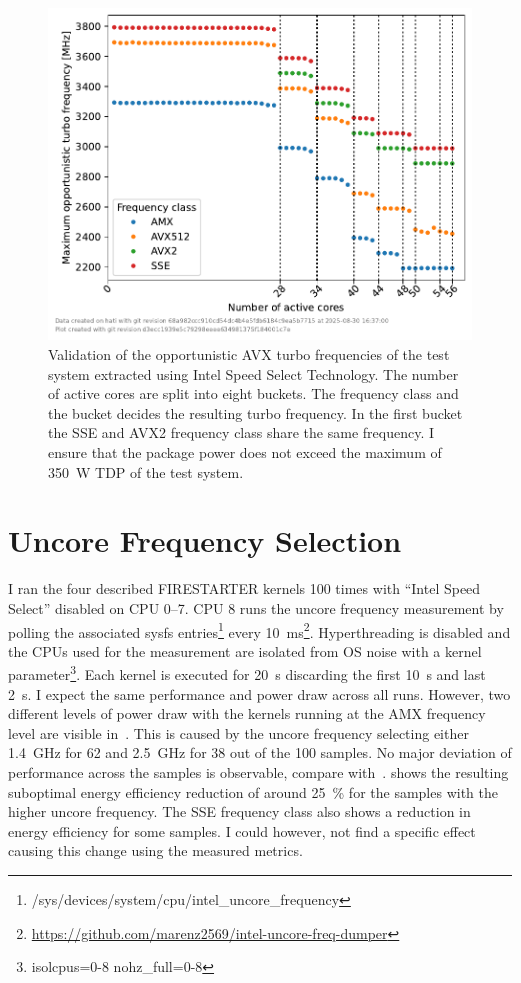 \begin{figure}[]
    \centering
    \includegraphics[width=0.8\columnwidth]{fig/avx-frequency-license-bands-validation/validate-avx-frequency-license-bands.pdf}
    \caption{\label{fig:validated-p0n-frequencies}Validation of the opportunistic AVX turbo frequencies of the test system extracted using Intel Speed Select Technology.
    The number of active cores are split into eight buckets. The frequency class and the bucket decides the resulting turbo frequency.
    In the first bucket the SSE and AVX2 frequency class share the same frequency. I ensure that the package power does not exceed the maximum of \SI{350}{\watt} TDP of the test system.}
\end{figure}

\section{Uncore Frequency Selection}
\label{sec:avx-anomalies-uncore-freqency}

I ran the four described FIRESTARTER kernels \SI{100}{} times with ``Intel Speed Select'' disabled on CPU 0--7.
CPU 8 runs the uncore frequency measurement by polling the associated sysfs entries\footnote{/sys/devices/system/cpu/intel\_uncore\_frequency} every \SI{10}{\ms}\footnote{\url{https://github.com/marenz2569/intel-uncore-freq-dumper}}.
Hyperthreading is disabled and the CPUs used for the measurement are isolated from OS noise with a kernel parameter\footnote{isolcpus=0-8 nohz\_full=0-8}.
Each kernel is executed for \SI{20}{\s} discarding the first \SI{10}{\s} and last \SI{2}{\s}.
I expect the same performance and power draw across all runs.
However, two different levels of power draw with the kernels running at the AMX frequency level are visible in~.
This is caused by the uncore frequency selecting either \SI{1.4}{\GHz} for \SI{62}{} and \SI{2.5}{\GHz} for \SI{38}{} out of the \SI{100}{} samples.
No major deviation of performance across the samples is observable, compare with~.
 shows the resulting suboptimal energy efficiency reduction of around \SI{25}{\percent} for the samples with the higher uncore frequency.
The SSE frequency class also shows a reduction in energy efficiency for some samples.
I could however, not find a specific effect causing this change using the measured metrics.

